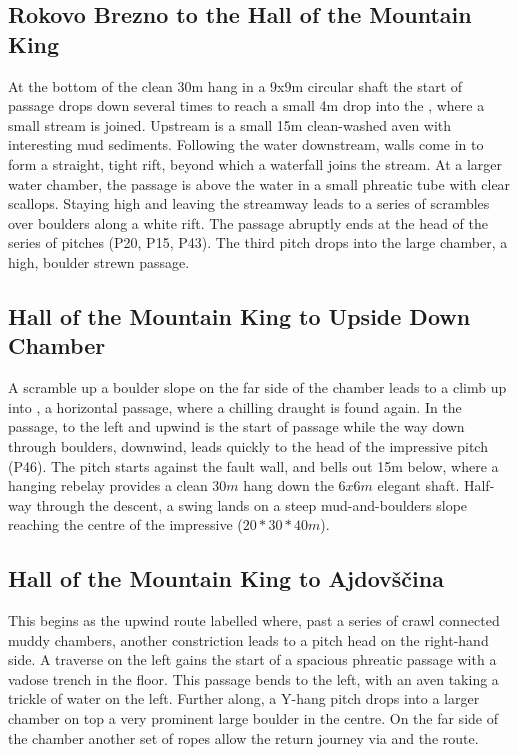 \subsection{Rokovo Brezno to the Hall of the Mountain King}
 At the bottom of the clean 30m hang in a 9x9m circular shaft the start of  passage drops down several times to reach a small 4m drop into the , where a small stream is joined. Upstream is a small 15m clean-washed aven with interesting mud sediments. Following the water downstream, walls come in to form a straight, tight rift, beyond which a waterfall joins the stream. At a larger water chamber, the passage is above the water in a small phreatic tube with clear scallops. Staying high and leaving the streamway leads to a series of scrambles over boulders along a white rift. The passage abruptly ends at the head of the  series of pitches (P20, P15, P43). The third pitch drops into the large  chamber, a high, boulder strewn passage.

\subsection{Hall of the Mountain King to Upside Down Chamber}
A scramble up a boulder slope on the far side of the chamber leads to a climb up into , a horizontal passage, where a chilling draught is found again. In the passage, to the left and upwind is the start of  passage while the way down through boulders, downwind, leads quickly to the head of the impressive  pitch (P46). The pitch starts against the fault wall, and bells out 15m below, where a hanging rebelay provides a clean $30m$ hang down the $6x6m$ elegant shaft. Half-way through the descent, a swing lands on a steep mud-and-boulders slope reaching the centre of the impressive  ($20*30*40m$).

\subsection{Hall of the Mountain King to Ajdov\v{s}\v{c}ina}
This begins as the upwind route labelled  where, past a series of crawl connected muddy chambers, another constriction leads to a pitch head on the right-hand side. A traverse on the left gains the start of  a spacious phreatic passage with a vadose trench in the floor. This passage bends to the left, with an aven taking a trickle of water on the left. Further along, a Y-hang pitch drops into a larger chamber on top a very prominent large boulder in the centre. On the far side of the chamber another set of ropes allow the return journey via  and the  route.

